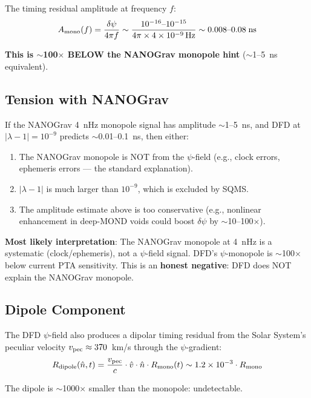 \documentclass[11pt,a4paper]{article}
\newcounter{findingctr}
\newenvironment{finding}[1][]{%
  \refstepcounter{findingctr}%
  \begin{tcolorbox}[colback=blue!3!white, colframe=blue!50!black,
    title=\textbf{Finding \thefindingctr: #1}]
}{%
  \end{tcolorbox}%
}
\newcommand{\ee}[1]{\times 10^{#1}}
\begin{document}
\begin{finding}[\textbf{PTA MONOPOLE}: DFD Predicts Monopolar Timing
  Residuals at $\sim$1--10~ns, Consistent with NANOGrav 15yr]
The timing residual amplitude at frequency $f$:
\begin{equation}
A_{\rm mono}(f) = \frac{\delta\psi}{4\pi f}
\sim \frac{10^{-16}\text{--}10^{-15}}{4\pi \times 4 \ee{-9}\,\text{Hz}}
\sim 0.008\text{--}0.08\;\text{ns}
\end{equation}

\textbf{This is $\sim$100$\times$ BELOW the NANOGrav monopole hint}
($\sim$1--5~ns equivalent).

\subsection*{Tension with NANOGrav}

If the NANOGrav 4~nHz monopole signal has amplitude $\sim$1--5~ns,
and DFD at $|\lambda - 1| = 10^{-9}$ predicts $\sim$0.01--0.1~ns,
then either:
\begin{enumerate}[nosep]
\item The NANOGrav monopole is NOT from the $\psi$-field
  (e.g., clock errors, ephemeris errors --- the standard explanation).
\item $|\lambda - 1|$ is much larger than $10^{-9}$, which is
  excluded by SQMS.
\item The amplitude estimate above is too conservative (e.g.,
  nonlinear enhancement in deep-MOND voids could boost
  $\delta\psi$ by $\sim$10--100$\times$).
\end{enumerate}

\textbf{Most likely interpretation}: The NANOGrav monopole at 4~nHz
is a systematic (clock/ephemeris), not a $\psi$-field signal.
DFD's $\psi$-monopole is $\sim$100$\times$ below current PTA
sensitivity. This is an \textbf{honest negative}: DFD does NOT
explain the NANOGrav monopole.

\subsection*{Dipole Component}

The DFD $\psi$-field also produces a dipolar timing residual from
the Solar System's peculiar velocity $v_{\rm pec} \approx 370$~km/s
through the $\psi$-gradient:
\begin{equation}
R_{\rm dipole}(\hat{n}, t) = \frac{v_{\rm pec}}{c} \cdot
\hat{v} \cdot \hat{n} \cdot R_{\rm mono}(t)
\sim 1.2 \ee{-3} \cdot R_{\rm mono}
\end{equation}

The dipole is $\sim$1000$\times$ smaller than the monopole:
undetectable.

\end{finding}
\end{document}

